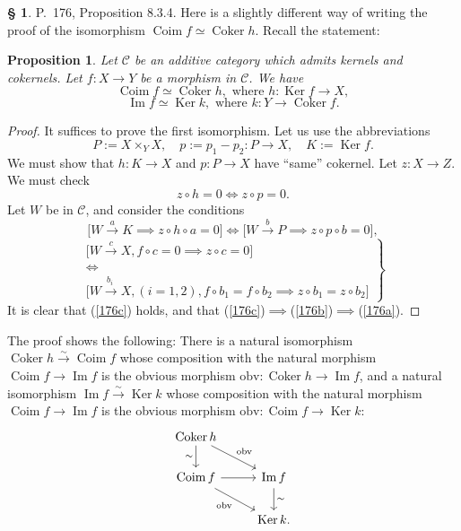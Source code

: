\documentclass[12pt]{article}
\newtheorem{prop}[thm]{Proposition}
\theoremstyle{remark}
\theoremstyle{definition}
\newtheorem{s}[thm]{\S}
\newcommand{\C}{\mathcal C}
\DeclareMathOperator{\Coim}{Coim}
\DeclareMathOperator{\Coker}{Coker}
\DeclareMathOperator{\Ima}{Im}
\DeclareMathOperator{\Ker}{Ker}
\begin{document}
\begin{s}\label{c176a}
P.~176, Proposition 8.3.4. Here is a slightly different way of writing the proof of the isomorphism $\Coim f\simeq\Coker h$. Recall the statement: 
%
\begin{prop} 
Let $\C$ be an additive category which admits kernels and cokernels. Let $f:X\to Y$ be a morphism in $\C$. We have 
$$ 
\Coim f\simeq\Coker h,\text{ where }h:\Ker f\to X, 
$$ 
$$ 
\Ima f\simeq\Ker k,\text{ where }k:Y\to\Coker f.
$$ 
\end{prop}
%
\begin{proof}
It suffices to prove the first isomorphism. Let us use the abbreviations 
$$
P:=X\times_YX,\quad p:=p_1-p_2:P\to X,\quad K:=\Ker f.
$$
We must show that $h:K\to X$ and $p:P\to X$ have ``same'' cokernel. Let $z:X\to Z$. We must check 
%
\begin{equation}\label{176a}
z\circ h=0\iff z\circ p=0.
\end{equation}
%
Let $W$ be in $\C$, and consider the conditions 
%
\begin{equation}\label{176b}
\Big[W\overset{a}{\to}K\implies z\circ h\circ a=0\Big]\iff\Big[W\overset{b}{\to}P\implies z\circ p\circ b=0\Big],
\end{equation}
%
\begin{equation}\label{176c}%
\left.
\begin{matrix}
\Big[W\overset{c}{\to}X,f\circ c=0\implies z\circ c=0\Big]\\ 
\iff\\ 
\Big[W\overset{b_i\ }{\to}X,(i=1,2),f\circ b_1=f\circ b_2\implies z\circ b_1=z\circ b_2\Big]
\end{matrix}
\right\}
\end{equation}
It is clear that (\ref{176c}) holds, and that (\ref{176c})$\implies$(\ref{176b})$\implies$(\ref{176a}).
\end{proof}

The proof shows the following: There is a natural isomorphism $\Coker h\xrightarrow{\sim}\Coim f$ whose composition with the natural morphism $\Coim f\to\Ima f$ is the obvious morphism $\text{obv}:\Coker h\to\Ima f$, and a natural isomorphism $\Ima f\xrightarrow{\sim}\Ker k$ whose composition with the natural morphism $\Coim f\to\Ima f$ is the obvious morphism $\text{obv}:\Coim f\to\Ker k$: 
$$
\begin{tikzcd}
\Coker h\ar{d}[swap]{\sim}\ar{dr}{\text{obv}}\\
\Coim f\ar{r}\ar{dr}[swap]{\text{obv}}&\Ima f\ar{d}{\sim}\\
&\Ker k.
\end{tikzcd}
$$
\end{s}
\end{document}
